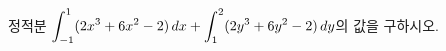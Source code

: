 정적분 $\displaystyle\int_{-1}^{1}(2x^3+6x^2-2)\mkern3mu dx+\int_{1}^{2}(2y^3+6y^2-2)\mkern3mu dy$의 값을 구하시오.
